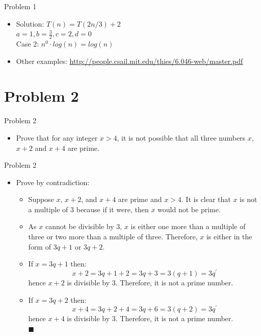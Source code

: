\documentclass{beamer}
\begin{document}
\begin{frame}{Problem 1}
   \begin{itemize}
        \item Solution:
            $T(n) = T(2n/3) + 2$
            \\ $a = 1, b = \frac{3}{2}, c = 2, d = 0$
            \\ Case 2: $n^0 \cdot log(n) = log(n)$
       \item Other examples: \url{http://people.csail.mit.edu/thies/6.046-web/master.pdf}      
    \end{itemize}
\end{frame}

\section{Problem 2}

\begin{frame}{Problem 2}
   \begin{itemize}
          \item  Prove that for any integer $x>4$, it is not possible that all three numbers $x$, $x + 2$ and $x + 4$ are prime.
      \end{itemize}
\end{frame}

\begin{frame}{Problem 2}
   \begin{itemize}
        \item  Prove by contradiction:
        \begin{itemize}
            \item Suppose $x$, $x+2$, and $x+4$ are prime and $x > 4$.  It is clear that $x$ is not a multiple of 3 because if it were, then $x$ would not be prime. 
            \item As $x$ cannot be divisible by 3, $x$ is either one more than a multiple of three or two more than a multiple of three.  Therefore, $x$ is either in the form of $3q + 1$ or $3q + 2$.  
            \item If $x = 3q + 1$ then: $$x + 2 = 3q + 1 + 2 = 3q + 3 = 3(q + 1) = 3q^{'}$$ hence $x + 2$ is divisible by 3. Therefore, it is not a prime number.
            \item If $x = 3q + 2$ then: $$x + 4 = 3q + 2 + 4 = 3q + 6 = 3(q + 2) = 3q^{'}$$ hence $x + 4$ is divisible by 3. Therefore, it is not a prime number.
            \\ \hspace{10cm} {\tiny $\blacksquare$}
        \end{itemize}
    \end{itemize}
\end{frame}
\end{document}
